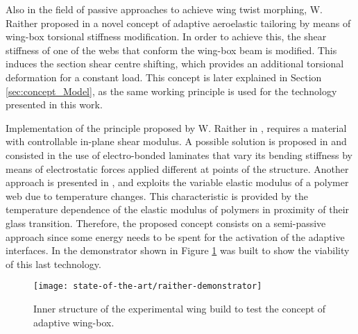   Also in the field of passive approaches to achieve wing twist morphing, W. Raither proposed in \cite{Raither2013a} a novel concept of adaptive aeroelastic tailoring by means of wing-box torsional stiffness modification. In order to achieve this, the shear stiffness of one of the webs that conform the wing-box beam is modified. This induces the section shear centre shifting, which provides an additional torsional deformation for a constant load. This concept is later explained in Section \ref{sec:concept_Model}, as the same working principle is used for the technology presented in this work.

  Implementation of the principle proposed by W. Raither in \cite{Raither2013a}, requires a material with controllable in-plane shear modulus. A possible solution is proposed in \cite{Bergamini2006} and consisted in the use of electro-bonded laminates that vary its bending stiffness by means of electrostatic forces applied different at points of the structure. Another approach is presented in \cite{Raither2012}, and exploits the variable elastic modulus of a polymer web due to temperature changes. This characteristic is provided by the temperature dependence of the elastic modulus of polymers in proximity of their glass transition. Therefore, the proposed concept consists on a semi-passive approach since some energy needs to be spent for the activation of the adaptive interfaces. In \cite{Raither2013} the demonstrator shown in Figure \ref{fig:raither-demonstrator} was built to show the viability of this last technology.

  \begin{figure}[!htpb]
    \centering
    \texttt{[image: state-of-the-art/raither-demonstrator]}
    \caption[Inner structure of the experimental wing build to test the concept of adaptive wing-box]{Inner structure of the experimental wing build to test the concept of adaptive wing-box. \cite{Raither2013}}\label{fig:raither-demonstrator}
  \end{figure}

